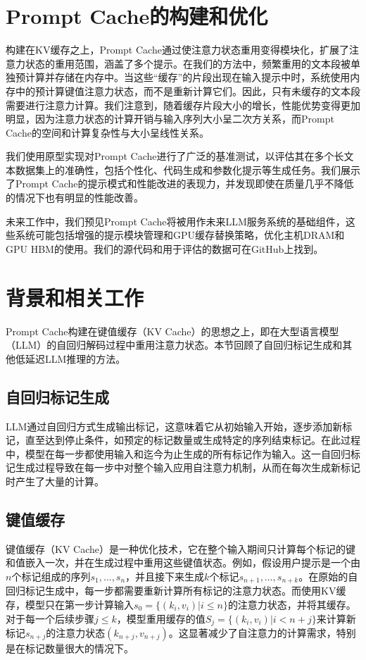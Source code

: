 \documentclass[twocolumn, 10pt]{article} %
\theoremstyle{remark}
\begin{document}
\section{Prompt Cache的构建和优化}

构建在KV缓存之上，Prompt Cache通过使注意力状态重用变得模块化，扩展了注意力状态的重用范围，涵盖了多个提示。在我们的方法中，频繁重用的文本段被单独预计算并存储在内存中。当这些“缓存”的片段出现在输入提示中时，系统使用内存中的预计算键值注意力状态，而不是重新计算它们。因此，只有未缓存的文本段需要进行注意力计算。我们注意到，随着缓存片段大小的增长，性能优势变得更加明显，因为注意力状态的计算开销与输入序列大小呈二次方关系，而Prompt Cache的空间和计算复杂性与大小呈线性关系。

我们使用原型实现对Prompt Cache进行了广泛的基准测试，以评估其在多个长文本数据集上的准确性，包括个性化、代码生成和参数化提示等生成任务。我们展示了Prompt Cache的提示模式和性能改进的表现力，并发现即使在质量几乎不降低的情况下也有明显的性能改善。

未来工作中，我们预见Prompt Cache将被用作未来LLM服务系统的基础组件，这些系统可能包括增强的提示模块管理和GPU缓存替换策略，优化主机DRAM和GPU HBM的使用。我们的源代码和用于评估的数据可在GitHub上找到。


\section{背景和相关工作}

Prompt Cache构建在键值缓存（KV Cache）的思想之上，即在大型语言模型（LLM）的自回归解码过程中重用注意力状态。本节回顾了自回归标记生成和其他低延迟LLM推理的方法。

\subsection{自回归标记生成}

LLM通过自回归方式生成输出标记，这意味着它从初始输入开始，逐步添加新标记，直至达到停止条件，如预定的标记数量或生成特定的序列结束标记。在此过程中，模型在每一步都使用输入和迄今为止生成的所有标记作为输入。这一自回归标记生成过程导致在每一步中对整个输入应用自注意力机制，从而在每次生成新标记时产生了大量的计算。

\subsection{键值缓存}

键值缓存（KV Cache）是一种优化技术，它在整个输入期间只计算每个标记的键和值嵌入一次，并在生成过程中重用这些键值状态。例如，假设用户提示是一个由$n$个标记组成的序列$s_1, \ldots, s_n$，并且接下来生成$k$个标记$s_{n+1}, \ldots, s_{n+k}$。在原始的自回归标记生成中，每一步都需要重新计算所有标记的注意力状态。而使用KV缓存，模型只在第一步计算输入$s_0 = \{(k_i, v_i) | i \leq n\}$的注意力状态，并将其缓存。对于每一个后续步骤$j \leq k$，模型重用缓存的值$S_j = \{(k_i, v_i) | i < n + j\}$来计算新标记$s_{n+j}$的注意力状态$(k_{n+j}, v_{n+j})$。这显著减少了自注意力的计算需求，特别是在标记数量很大的情况下。
\end{document}
